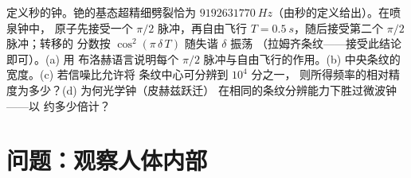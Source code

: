 \begin{exercise}[$\star\star\star$]\label{exo:b3:spin-two-level:12}
定义秒的钟。铯的基态超精细劈裂恰为
$\qty{9192631770}{Hz}$（由秒的定义给出）。在喷泉钟中，
原子先接受一个 $\pi/2$ 脉冲，再自由飞行
$T = \qty{0.5}{s}$，随后接受第二个 $\pi/2$ 脉冲；转移的
分数按 $\cos^2(\pi\,\delta\,T)$ 随失谐 $\delta$ 振荡
（拉姆齐条纹——接受此结论即可）。(a) 用
布洛赫语言说明每个 $\pi/2$ 脉冲与自由飞行的作用。(b)
中央条纹的宽度。(c) 若信噪比允许将
条纹中心可分辨到 $10^4$ 分之一，
则所得频率的相对精度为多少？(d) 为何光学钟（皮赫兹跃迁）
在相同的条纹分辨能力下胜过微波钟——以
约多少倍计？
\end{exercise}

\section{问题：观察人体内部}

